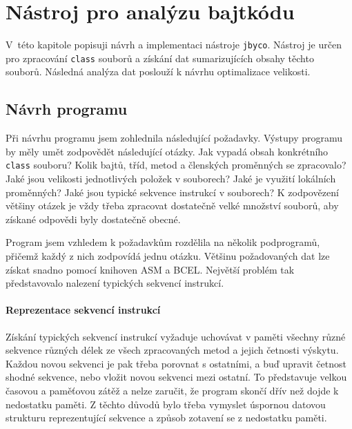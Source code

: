 \chapter{Nástroj pro analýzu bajtkódu}\label{Tool}


V~této kapitole popisuji návrh a implementaci nástroje \texttt{jbyco}. Nástroj je určen pro zpracování \texttt{class} souborů a získání dat sumarizujících obsahy těchto souborů. Následná analýza dat poslouží k návrhu optimalizace velikosti.

\section{Návrh programu}\label{ToolDesign}

Při návrhu programu jsem zohlednila následující požadavky. 
Výstupy programu by měly umět zodpovědět následující otázky. Jak vypadá obsah konkrétního \texttt{class} souboru? Kolik bajtů, tříd, metod a členských proměnných se zpracovalo? Jaké jsou velikosti jednotlivých položek v souborech? Jaké je využití lokálních proměnných? Jaké jsou typické sekvence instrukcí v souborech? K zodpovězení většiny otázek je vždy třeba zpracovat dostatečně velké množství souborů, aby získané odpovědi byly dostatečně obecné. 

Program jsem vzhledem k požadavkům rozdělila na několik podprogramů, přičemž každý z nich zodpovídá jednu otázku. 
Většinu požadovaných dat lze získat snadno pomocí knihoven ASM a BCEL. Největší problém tak představovalo nalezení typických sekvencí instrukcí.

\subsubsection{Reprezentace sekvencí instrukcí}

Získání typických sekvencí instrukcí vyžaduje uchovávat v paměti všechny různé sekvence různých délek ze všech zpracovaných metod a jejich četnosti výskytu. Každou novou sekvenci je pak třeba porovnat s ostatními, a buď upravit četnost shodné sekvence, nebo vložit novou sekvenci mezi ostatní. To představuje velkou časovou a paměťovou zátěž a nelze zaručit, že program skončí dřív než dojde k nedostatku paměti. Z těchto důvodů bylo třeba vymyslet úspornou datovou strukturu reprezentující sekvence a způsob zotavení se z nedostatku paměti.

